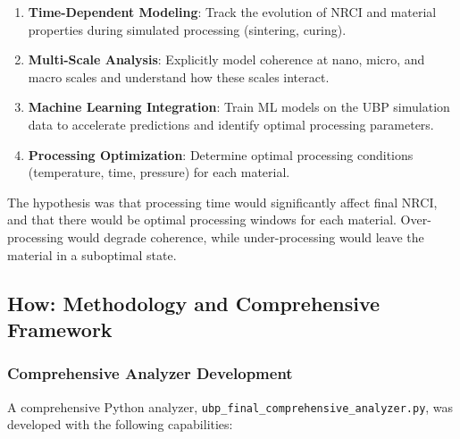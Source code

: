 \documentclass[11pt,a4paper]{article}
\begin{document}
\begin{enumerate}
    \item \textbf{Time-Dependent Modeling}: Track the evolution of NRCI and material properties during simulated processing (sintering, curing).
    
    \item \textbf{Multi-Scale Analysis}: Explicitly model coherence at nano, micro, and macro scales and understand how these scales interact.
    
    \item \textbf{Machine Learning Integration}: Train ML models on the UBP simulation data to accelerate predictions and identify optimal processing parameters.
    
    \item \textbf{Processing Optimization}: Determine optimal processing conditions (temperature, time, pressure) for each material.
\end{enumerate}

The hypothesis was that processing time would significantly affect final NRCI, and that there would be optimal processing windows for each material. Over-processing would degrade coherence, while under-processing would leave the material in a suboptimal state.

\subsection{How: Methodology and Comprehensive Framework}

\subsubsection{Comprehensive Analyzer Development}

A comprehensive Python analyzer, \texttt{ubp\_final\_comprehensive\_analyzer.py}, was developed with the following capabilities:
\end{document}
